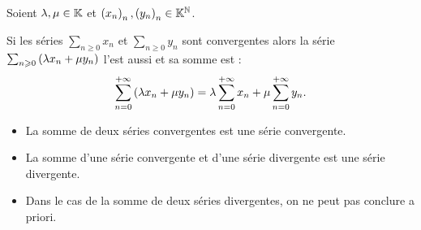 \begin{prop}
Soient \(\lambda,\mu\in\mathbb{K}\) et \(\left(x_n\right)_n,\left(y_n\right)_n\in\mathbb{K}^{\mathbb{N}}\).

Si les séries \(\sum_{n\geq0}x_n\) et \(\sum_{n\geq0}y_n\) sont convergentes alors la série \(\sum_{n\geqslant0}\left(\lambda x_n+\mu y_n\right)\) l'est aussi et sa somme est : \[\sum_{n=0}^{+\infty}\left(\lambda x_n+\mu y_n\right)=\lambda\sum_{n=0}^{+\infty}x_n+\mu\sum_{n=0}^{+\infty}y_n.\]
\end{prop}

\begin{dem}
\end{dem}

\begin{rem}
\begin{itemize}
    \item La somme de deux séries convergentes est une série convergente. \\
    \item La somme d'une série convergente et d'une série divergente est une série divergente. \\
    \item Dans le cas de la somme de deux séries divergentes, on ne peut pas conclure a priori.
\end{itemize}
\end{rem}